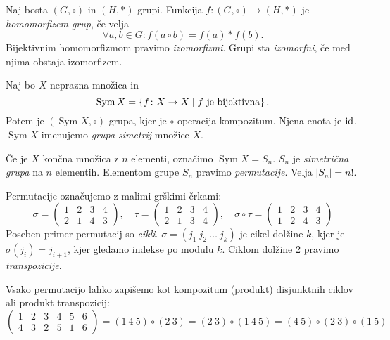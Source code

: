 \documentclass[12pt, a4paper]{article}
\begin{document}
\begin{definicija}
Naj bosta $(G,\circ)$ in $(H,*)$ grupi. Funkcija $f\colon (G,\circ)\to(H,*)$ je \emph{homomorfizem grup}, če velja
\[
\forall a,b\in G\colon f(a\circ b)=f(a)*f(b).
\]
Bijektivnim homomorfizmom pravimo \emph{izomorfizmi}. Grupi sta \emph{izomorfni}, če med njima obstaja izomorfizem.
\end{definicija}

\begin{definicija}
Naj bo $X$ neprazna množica in
\[
\operatorname{Sym}X=\left\{f\colon X\to X\mid \text{$f$ je bijektivna}\right\}.
\]
Potem je $(\operatorname{Sym}X,\circ)$ grupa, kjer je $\circ$ operacija kompozitum. Njena enota je $\operatorname{id}$. $\operatorname{Sym}X$ imenujemo \emph{grupa simetrij} množice $X$.
\end{definicija}

\begin{definicija}
Če je $X$ končna množica z $n$ elementi, označimo $\operatorname{Sym}X=S_n$. $S_n$ je \emph{simetrična grupa} na $n$ elementih. Elementom grupe $S_n$ pravimo \emph{permutacije}. Velja $|S_n|=n!$.
\end{definicija}

Permutacije označujemo z malimi grškimi črkami:
\[
\sigma=
\begin{pmatrix}
1 & 2 & 3 & 4 \\
2 & 1 & 4 & 3
\end{pmatrix},
\quad
\tau=
\begin{pmatrix}
1 & 2 & 3 & 4 \\
2 & 1 & 3 & 4
\end{pmatrix},
\quad
\sigma\circ\tau=
\begin{pmatrix}
1 & 2 & 3 & 4 \\
1 & 2 & 4 & 3
\end{pmatrix}
\]
Poseben primer permutacij so \emph{cikli}. $\sigma=(j_1~j_2~\dots~j_k)$ je cikel dolžine $k$, kjer je $\sigma(j_i)=j_{i+1}$, kjer gledamo indekse po modulu $k$. Ciklom dolžine 2 pravimo \emph{transpozicije}.

Vsako permutacijo lahko zapišemo kot kompozitum (produkt) disjunktnih ciklov ali produkt transpozicij:
\[
\begin{pmatrix}
1 & 2 & 3 & 4 & 5 & 6 \\
4 & 3 & 2 & 5 & 1 & 6
\end{pmatrix}
=(1~4~5)\circ(2~3)=(2~3)\circ(1~4~5)
=(4~5)\circ(2~3)\circ(1~5)
\]
\end{document}
